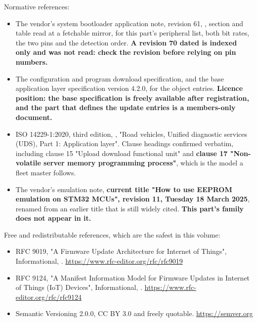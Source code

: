 Normative references:
\begin{itemize}
\item The vendor's system bootloader application note, revision 61, , section and table read at a fetchable mirror, for this part's peripheral
list, both bit rates, the two pins and the detection order. \textbf{A revision
70 dated  is indexed only and was not read: check the revision
before relying on pin numbers.}
\item The configuration and program download specification, and the base
application layer specification version 4.2.0, for the object entries.
\textbf{Licence position: the base specification is freely available after
registration, and the part that defines the update entries is a members-only
document.}
\item ISO 14229-1:2020, third edition, , "Road vehicles, Unified
diagnostic services (UDS), Part 1: Application layer". Clause headings confirmed
verbatim, including clause 15 "Upload download functional unit" and
\textbf{clause 17 "Non-volatile server memory programming process"}, which is
the model a fleet master follows.
\item The vendor's emulation note, \textbf{current title "How to use EEPROM
emulation on STM32 MCUs", revision 11, Tuesday 18 March 2025}, renamed from an
earlier title that is still widely cited. \textbf{This part's family does not
appear in it.}
\end{itemize}

Free and redistributable references, which are the safest in this volume:
\begin{itemize}
\item RFC 9019, "A Firmware Update Architecture for Internet of Things",
Informational, .\newline
\url{https://www.rfc-editor.org/rfc/rfc9019}
\item RFC 9124, "A Manifest Information Model for Firmware Updates in Internet
of Things (IoT) Devices", Informational, .\newline
\url{https://www.rfc-editor.org/rfc/rfc9124}
\item Semantic Versioning 2.0.0, CC BY 3.0 and freely quotable.\newline
\url{https://semver.org}
\end{itemize}

